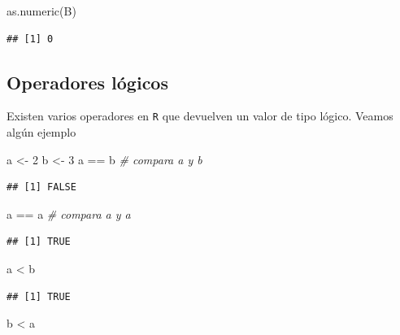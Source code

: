 \documentclass[
]{book}
\newenvironment{Shaded}{\begin{snugshade}}{\end{snugshade}}
\newcommand{\CommentTok}[1]{\textcolor[rgb]{0.56,0.35,0.01}{\textit{#1}}}
\newcommand{\DecValTok}[1]{\textcolor[rgb]{0.00,0.00,0.81}{#1}}
\newcommand{\FunctionTok}[1]{\textcolor[rgb]{0.00,0.00,0.00}{#1}}
\newcommand{\NormalTok}[1]{#1}
\newcommand{\OtherTok}[1]{\textcolor[rgb]{0.56,0.35,0.01}{#1}}
\newcommand{\SpecialCharTok}[1]{\textcolor[rgb]{0.00,0.00,0.00}{#1}}
\theoremstyle{break}
\theoremstyle{nonumberplain}
\begin{document}
\begin{Shaded}
\begin{Highlighting}[]
\FunctionTok{as.numeric}\NormalTok{(B)}
\end{Highlighting}
\end{Shaded}

\begin{verbatim}
## [1] 0
\end{verbatim}

\hypertarget{operadores-luxf3gicos}{%
\subsection{Operadores lógicos}\label{operadores-luxf3gicos}}

Existen varios operadores en
\texttt{R} que devuelven un valor de tipo lógico. Veamos algún ejemplo

\begin{Shaded}
\begin{Highlighting}[]
\NormalTok{a }\OtherTok{\textless{}{-}} \DecValTok{2}
\NormalTok{b }\OtherTok{\textless{}{-}} \DecValTok{3}
\NormalTok{a }\SpecialCharTok{==}\NormalTok{ b  }\CommentTok{\# compara a y b}
\end{Highlighting}
\end{Shaded}

\begin{verbatim}
## [1] FALSE
\end{verbatim}

\begin{Shaded}
\begin{Highlighting}[]
\NormalTok{a }\SpecialCharTok{==}\NormalTok{ a  }\CommentTok{\# compara a y a}
\end{Highlighting}
\end{Shaded}

\begin{verbatim}
## [1] TRUE
\end{verbatim}

\begin{Shaded}
\begin{Highlighting}[]
\NormalTok{a }\SpecialCharTok{\textless{}}\NormalTok{ b}
\end{Highlighting}
\end{Shaded}

\begin{verbatim}
## [1] TRUE
\end{verbatim}

\begin{Shaded}
\begin{Highlighting}[]
\NormalTok{b }\SpecialCharTok{\textless{}}\NormalTok{ a}
\end{Highlighting}
\end{Shaded}
\end{document}
